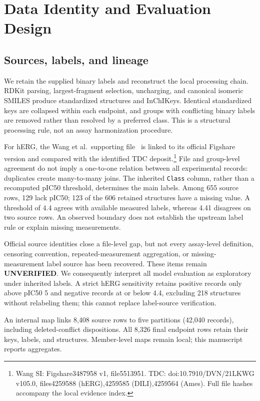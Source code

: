 \documentclass[runningheads,a4paper]{llncs}
\begin{document}
\section{Data Identity and Evaluation Design}
\subsection{Sources, labels, and lineage}
We retain the supplied binary labels and reconstruct the local processing chain. RDKit parsing, largest-fragment selection, uncharging, and canonical isomeric SMILES produce standardized structures and InChIKeys. Identical standardized keys are collapsed within each endpoint, and groups with conflicting binary labels are removed rather than resolved by a preferred class. This is a structural processing rule, not an assay harmonization procedure.



For hERG, the Wang et al.\ supporting file~\cite{wang2016herg} is linked to its official Figshare version and compared with the identified TDC deposit.\footnote{Wang SI: Figshare3487958 v1, file5513951. TDC: doi:10.7910/DVN/21LKWG v105.0, files4259588 (hERG),4259585 (DILI),4259564 (Ames). Full file hashes accompany the local evidence index.} File and group-level agreement do not imply a one-to-one relation between all experimental records: duplicates create many-to-many joins. The inherited \texttt{Class} column, rather than a recomputed pIC50 threshold, determines the main labels. Among 655 source rows, 129 lack pIC50; 123 of the 606 retained structures have a missing value. A threshold of 4.4 agrees with available measured labels, whereas 4.41 disagrees on two source rows. An observed boundary does not establish the upstream label rule or explain missing measurements.

Official source identities close a file-level gap, but not every assay-level definition, censoring convention, repeated-measurement aggregation, or missing-measurement label source has been recovered. These items remain \textbf{UNVERIFIED}. We consequently interpret all model evaluation as exploratory under inherited labels. A strict hERG sensitivity retains positive records only above pIC50 5 and negative records at or below 4.4, excluding 218 structures without relabeling them; this cannot replace label-source verification.

An internal map links 8,408 source rows to five partitions (42,040 records), including deleted-conflict dispositions. All 8,326 final endpoint rows retain their keys, labels, and structures. Member-level maps remain local; this manuscript reports aggregates.
\end{document}
